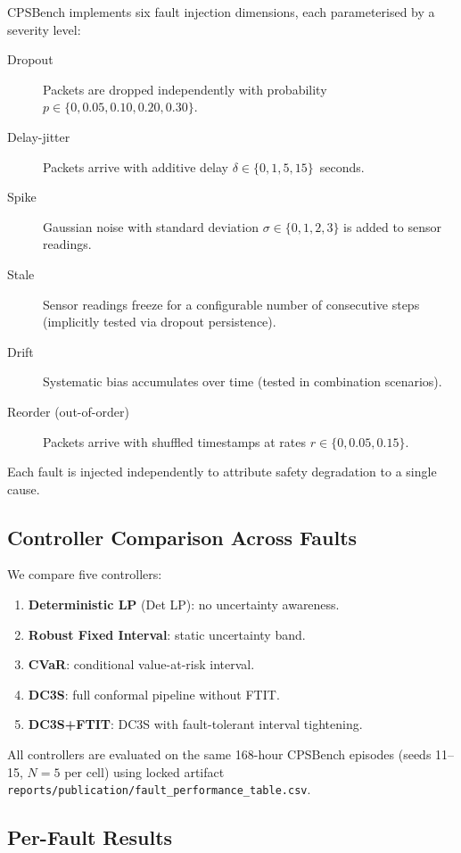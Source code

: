 CPSBench implements six fault injection dimensions, each parameterised
by a severity level:

\begin{description}
  \item[Dropout] Packets are dropped independently with probability
    $p \in \{0, 0.05, 0.10, 0.20, 0.30\}$.
  \item[Delay-jitter] Packets arrive with additive delay
    $\delta \in \{0, 1, 5, 15\}$~seconds.
  \item[Spike] Gaussian noise with standard deviation
    $\sigma \in \{0, 1, 2, 3\}$ is added to sensor readings.
  \item[Stale] Sensor readings freeze for a configurable number of
    consecutive steps (implicitly tested via dropout persistence).
  \item[Drift] Systematic bias accumulates over time (tested in
    combination scenarios).
  \item[Reorder (out-of-order)] Packets arrive with shuffled timestamps
    at rates $r \in \{0, 0.05, 0.15\}$.
\end{description}

Each fault is injected independently to attribute safety degradation
to a single cause.

\subsection{Controller Comparison Across Faults}

We compare five controllers:
\begin{enumerate}
  \item \textbf{Deterministic LP} (Det LP): no uncertainty awareness.
  \item \textbf{Robust Fixed Interval}: static uncertainty band.
  \item \textbf{CVaR}: conditional value-at-risk interval.
  \item \textbf{DC3S}: full conformal pipeline without FTIT.
  \item \textbf{DC3S+FTIT}: DC3S with fault-tolerant interval tightening.
\end{enumerate}

All controllers are evaluated on the same 168-hour CPSBench episodes
(seeds 11--15, $N=5$ per cell) using locked artifact
\texttt{reports/publication/fault\_performance\_table.csv}.

\subsection{Per-Fault Results}

